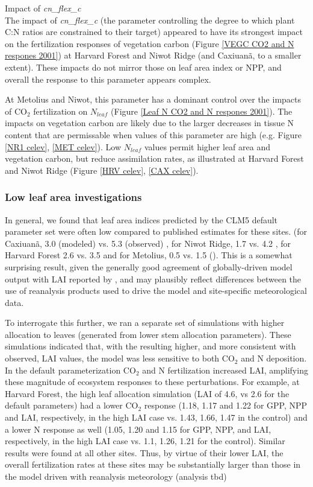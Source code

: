 \documentclass[draft,linenumbers]{agujournal}
\begin{document}
Impact of \emph{cn\_flex\_c}\\
The impact of \emph{cn\_flex\_c} (the parameter controlling the degree to which plant C:N ratios are constrained to their target) appeared to have its strongest impact on the fertilization responses of vegetation carbon (Figure \ref{VEGC CO2 and N respones 2001})  at Harvard Forest and Niwot Ridge (and Caxiuan\~a, to a smaller extent). These impacts do not mirror those on leaf area index or NPP, and overall the response to this parameter appears complex. 

At Metolius and Niwot, this parameter has a dominant control over the impacts of CO$_{2}$ fertilization on $N_{leaf}$ (Figure \ref{Leaf N CO2 and N respones 2001}).  The impacts on vegetation carbon are likely due to the larger decreases in tissue N content that are permissable when values of this parameter are high (e.g. Figure \ref{NR1 celev}, \ref{MET celev}).  Low  $N_{leaf}$ values permit higher leaf area and vegetation carbon, but reduce assimilation rates, as illustrated at Harvard Forest and Niwot Ridge (Figure \ref{HRV celev}, \ref{CAX celev}).  

\subsubsection{Low leaf area investigations}
In general, we found that leaf area indices predicted by the CLM5 default parameter set were often low  compared to published estimates for these sites. (for Caxiuan\~a, 3.0 (modeled) vs. 5.3 (observed) \cite{fisher2007}, for Niwot Ridge, 1.7 vs. 4.2 \cite{bowling2009}, for Harvard Forest 2.6 vs. 3.5 \cite{williams1996} and for Metolius, 0.5 vs. 1.5 (\cite{spadavecchia2011}). This is a somewhat surprising result, given the generally good agreement of globally-driven model output with LAI reported by \cite{lawrence2018}, and may plausibly reflect differences between the use of reanalysis products used to drive the model and site-specific meteorological data. 

To interrogate this further, we ran a separate set of simulations with higher allocation to leaves (generated from lower stem allocation parameters). These simulations indicated that, with the resulting higher, and more consistent with observed, LAI values, the model was less sensitive to both CO$_{2}$ and N deposition. In the default parameterization CO$_{2}$ and N fertilization increased LAI, amplifying these magnitude of ecosystem responses to these perturbations. For example, at Harvard Forest, the high leaf allocation simulation (LAI of 4.6, vs 2.6 for the default parameters) had a lower CO$_{2}$ response (1.18, 1.17 and 1.22 for GPP, NPP and LAI, respectively, in the high LAI case vs. 1.43, 1.66, 1.47 in the control) and a lower N response as well (1.05, 1.20 and 1.15 for GPP, NPP, and LAI, respectively, in the high LAI case vs. 1.1, 1.26, 1.21 for the control). Similar results were found at all other sites.  Thus, by virtue of their lower LAI, the overall fertilization rates at these sites may be substantially larger than those in the model driven with reanalysis meteorology (analysis tbd)
\end{document}
